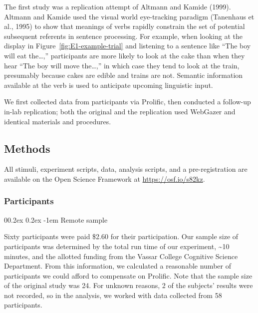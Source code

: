 \documentclass[
  man,floatsintext]{apa6}
\makeatletter
\let\oldparagraph\paragraph
\renewcommand{\paragraph}[1]{\oldparagraph{#1}\mbox{}}
\renewcommand{\paragraph}{\@startsection{paragraph}{4}{\parindent}%
  {0\baselineskip \@plus 0.2ex \@minus 0.2ex}%
  {-1em}%
  {\normalfont\normalsize\bfseries\itshape\typesectitle}}
\makeatother
\begin{document}
The first study was a replication attempt of
Altmann and Kamide (1999). Altmann and Kamide used the
visual world eye-tracking paradigm (Tanenhaus et al., 1995) to show that
meanings of verbs rapidly constrain the set of potential subsequent
referents in sentence processing. For example, when looking at the
display in Figure~\ref{fig:E1-example-trial} and listening to a sentence like
``The boy will eat the\ldots,'' participants are more likely to look at the cake than
when they hear ``The boy will move the\ldots,'' in which case they tend to look at the
train, presumably because cakes are edible and trains are not. Semantic
information available at the verb is used to anticipate upcoming
linguistic input.

We first collected data from participants via Prolific, then conducted a follow-up in-lab replication; both the original and the replication used WebGazer and identical materials and procedures.

\hypertarget{methods}{%
\subsection{Methods}\label{methods}}

All stimuli, experiment scripts, data, analysis scripts, and a
pre-registration are available on the Open Science Framework at
\url{https://osf.io/s82kz}.

\hypertarget{participants-1}{%
\subsubsection{Participants}\label{participants-1}}

\hypertarget{remote-sample}{%
\paragraph{Remote sample}\label{remote-sample}}

Sixty participants were paid \$2.60 for their participation. Our sample size
of participants was determined by the total run time of our experiment,
\textasciitilde10 minutes, and the allotted funding from the Vassar College Cognitive
Science Department. From this information, we calculated a reasonable
number of participants we could afford to compensate on Prolific. Note
that the sample size of the original study was 24. For unknown reasons,
2 of the subjects' results were not recorded, so in the analysis, we
worked with data collected from 58 participants.
\end{document}
